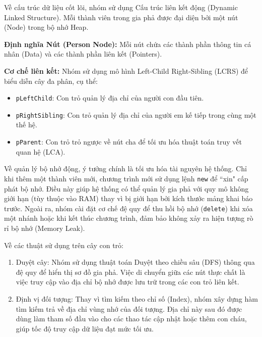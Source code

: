 Về cấu trúc dữ liệu cốt lõi, nhóm sử dụng Cấu trúc liên kết động (Dynamic Linked Structure). Mỗi thành viên trong gia phả được đại diện bởi một nút (Node) trong bộ nhớ Heap.

\textbf{Định nghĩa Nút (Person Node):} Mỗi nút chứa các thành phần thông tin cá nhân (Data) và các thành phần liên kết (Pointers).

\textbf{Cơ chế liên kết:} Nhóm sử dụng mô hình Left-Child Right-Sibling (LCRS) để biểu diễn cây đa phân, cụ thể:
\begin{itemize}
	\item \texttt{pLeftChild}: Con trỏ quản lý địa chỉ của người con đầu tiên.
	\item \texttt{pRightSibling}: Con trỏ quản lý địa chỉ của người em kế tiếp trong cùng một thế hệ.
	\item \texttt{pParent}: Con trỏ trỏ ngược về nút cha để tối ưu hóa thuật toán truy vết quan hệ (LCA).
\end{itemize}

Về quản lý bộ nhớ động, ý tưởng chính là tối ưu hóa tài nguyên hệ thống. Chỉ khi thêm một thành viên mới, chương trình mới sử dụng lệnh \texttt{new} để ``xin" cấp phát bộ nhớ. Điều này giúp hệ thống có thể quản lý gia phả với quy mô không giới hạn (tùy thuộc vào RAM) thay vì bị giới hạn bởi kích thước mảng khai báo trước. Ngoài ra, nhóm cài đặt cơ chế đệ quy để thu hồi bộ nhớ (\texttt{delete}) khi xóa một nhánh hoặc khi kết thúc chương trình, đảm bảo không xảy ra hiện tượng rò rỉ bộ nhớ (Memory Leak).

Về các thuật sử dụng trên cây con trỏ:
\begin{enumerate}
	\item Duyệt cây: Nhóm sử dụng thuật toán Duyệt theo chiều sâu (DFS) thông qua đệ quy để hiển thị sơ đồ gia phả. Việc di chuyển giữa các nút thực chất là việc truy cập vào địa chỉ bộ nhớ được lưu trữ trong các con trỏ liên kết.
	\item Định vị đối tượng: Thay vì tìm kiếm theo chỉ số (Index), nhóm xây dựng hàm tìm kiếm trả về địa chỉ vùng nhớ của đối tượng. Địa chỉ này sau đó được dùng làm tham số đầu vào cho các thao tác cập nhật hoặc thêm con cháu, giúp tốc độ truy cập dữ liệu đạt mức tối ưu.
\end{enumerate}
